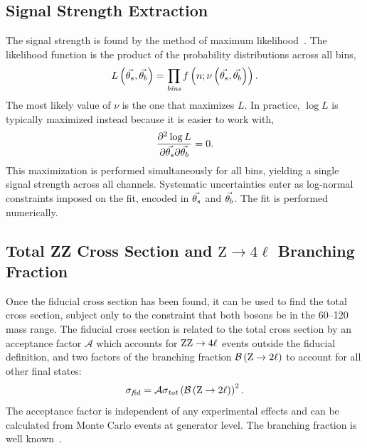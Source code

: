 \subsection{Signal Strength Extraction}

The signal strength is found by the method of maximum likelihood~\cite{Olive:2016xmw,bohm2010introduction}.
The likelihood function is the product of the probability distributions across all bins,
\begin{equation}
  L\left(\vec{\theta_s},\vec{\theta_b}\right) = \prod_\textit{bins} f\left(n; \nu\left(\vec{\theta_s},\vec{\theta_b}\right) \right).
\end{equation}
The most likely value of $\nu$ is the one that maximizes $L$.
In practice, $\log L$ is typically maximized instead because it is easier to work with,
\begin{equation}
  \frac{\partial^2 \log L}{\partial \vec{\theta_s} \partial \vec{\theta_b}} = 0.
\end{equation}
This maximization is performed simultaneously for all bins, yielding a single signal strength across all channels.
Systematic uncertainties enter as log-normal constraints imposed on the fit, encoded in $\vec{\theta_s}$ and $\vec{\theta_b}$.
The fit is performed numerically.


\subsection{Total ZZ Cross Section and \texorpdfstring{$\mathrm{Z} \to 4\ell$}{Z to 4l} Branching Fraction}

Once the fiducial cross section has been found, it can be used to find the total cross section, subject only to the constraint that both {\PZ} bosons be in the {60--120\GeV} mass range.
The fiducial cross section is related to the total cross section by an acceptance factor $\mathcal{A}$ which accounts for $\mathrm{Z}\mathrm{Z} \to 4\ell$ events outside the fiducial definition, and two factors of the {\PZ} branching fraction $\mathcal{B}\left(\mathrm{Z} \to 2\ell\right)$ to account for all other final states:
\begin{equation}
  \sigma_\mathit{fid} = \mathcal{A} \sigma_\mathit{tot} \left( \mathcal{B}\left(\mathrm{Z} \to 2\ell\right) \right)^2.
\end{equation}
The acceptance factor is independent of any experimental effects and can be calculated from Monte Carlo events at generator level.
The {\PZ} branching fraction is well known~\cite{Olive:2016xmw}.

